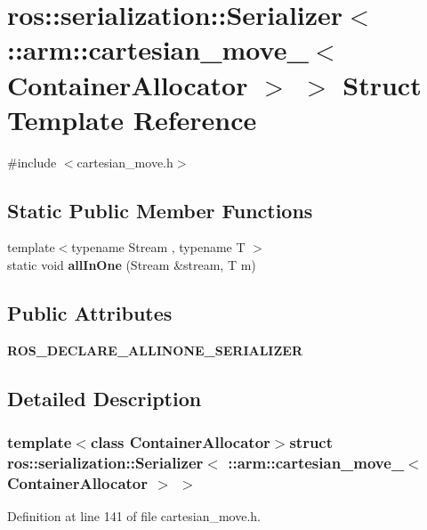 \section{ros\-:\-:serialization\-:\-:\-Serializer$<$ \-:\-:arm\-:\-:cartesian\-\_\-move\-\_\-$<$ \-Container\-Allocator $>$ $>$ \-Struct \-Template \-Reference}
\label{structros_1_1serialization_1_1Serializer_3_01_1_1arm_1_1cartesian__move___3_01ContainerAllocator_01_4_01_4}


{\ttfamily \#include $<$cartesian\-\_\-move.\-h$>$}

\subsection*{\-Static \-Public \-Member \-Functions}
\begin{DoxyCompactItemize}
\item 
{\footnotesize template$<$typename Stream , typename T $>$ }\\static void {\bf all\-In\-One} (\-Stream \&stream, \-T m)
\end{DoxyCompactItemize}
\subsection*{\-Public \-Attributes}
\begin{DoxyCompactItemize}
\item 
{\bf \-R\-O\-S\-\_\-\-D\-E\-C\-L\-A\-R\-E\-\_\-\-A\-L\-L\-I\-N\-O\-N\-E\-\_\-\-S\-E\-R\-I\-A\-L\-I\-Z\-E\-R}
\end{DoxyCompactItemize}


\subsection{\-Detailed \-Description}
\subsubsection*{template$<$class Container\-Allocator$>$struct ros\-::serialization\-::\-Serializer$<$ \-::arm\-::cartesian\-\_\-move\-\_\-$<$ Container\-Allocator $>$ $>$}



\-Definition at line 141 of file cartesian\-\_\-move.\-h.



